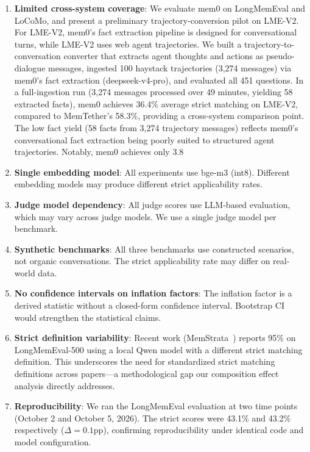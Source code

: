\documentclass{article}
\begin{document}
\begin{enumerate}
\item \textbf{Limited cross-system coverage}: We evaluate mem0 on LongMemEval and LoCoMo, and present a preliminary trajectory-conversion pilot on LME-V2. For LME-V2, mem0's fact extraction pipeline is designed for conversational turns, while LME-V2 uses web agent trajectories. We built a trajectory-to-conversation converter that extracts agent thoughts and actions as pseudo-dialogue messages, ingested 100 haystack trajectories (3,274 messages) via mem0's fact extraction (deepseek-v4-pro), and evaluated all 451 questions. In a full-ingestion run (3,274 messages processed over 49 minutes, yielding 58 extracted facts), mem0 achieves 36.4\% average strict matching on LME-V2, compared to MemTether's 58.3\%, providing a cross-system comparison point. The low fact yield (58 facts from 3,274 trajectory messages) reflects mem0's conversational fact extraction being poorly suited to structured agent trajectories. Notably, mem0 achieves only 3.8%
\item \textbf{Single embedding model}: All experiments use bge-m3 (int8). Different embedding models may produce different strict applicability rates.
\item \textbf{Judge model dependency}: All judge scores use LLM-based evaluation, which may vary across judge models. We use a single judge model per benchmark.
\item \textbf{Synthetic benchmarks}: All three benchmarks use constructed scenarios, not organic conversations. The strict applicability rate may differ on real-world data.
\item \textbf{No confidence intervals on inflation factors}: The inflation factor is a derived statistic without a closed-form confidence interval. Bootstrap CI would strengthen the statistical claims.
\item \textbf{Strict definition variability}: Recent work (MemStrata~\citep{memstrata2026}) reports 95\% on LongMemEval-500 using a local Qwen model with a different strict matching definition. This underscores the need for standardized strict matching definitions across papers—a methodological gap our composition effect analysis directly addresses.
\item \textbf{Reproducibility}: We ran the LongMemEval evaluation at two time points (October 2 and October 5, 2026). The strict scores were 43.1\% and 43.2\% respectively ($\Delta = 0.1$pp), confirming reproducibility under identical code and model configuration.\end{enumerate}
\end{document}

